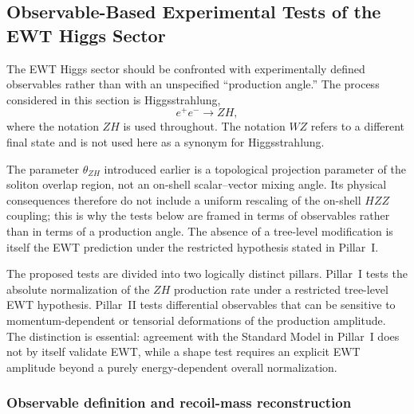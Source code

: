 \documentclass[10pt,a4paper]{article}
\begin{document}
\begin{center}
\end{center}

\subsection{Observable-Based Experimental Tests of the EWT Higgs Sector}
\label{sec:ewt_higgs_observable_tests}

The EWT Higgs sector should be confronted with experimentally defined observables rather than with an unspecified ``production angle.'' The process considered in this section is Higgsstrahlung,
\begin{equation}
	e^+e^- \to ZH,
\end{equation}
where the notation $ZH$ is used throughout. The notation $WZ$ refers to a different final state and is not used here as a synonym for Higgsstrahlung.

The parameter $\theta_{ZH}$ introduced earlier is a topological
projection parameter of the soliton overlap region, not an on-shell
scalar--vector mixing angle. Its physical consequences therefore do
not include a uniform rescaling of the on-shell $HZZ$ coupling; this
is why the tests below are framed in terms of observables rather than
in terms of a production angle. The absence of a tree-level
modification is itself the EWT prediction under the restricted
hypothesis stated in Pillar~I.

The proposed tests are divided into two logically distinct pillars. Pillar~I tests the absolute normalization of the $ZH$ production rate under a restricted tree-level EWT hypothesis. Pillar~II tests differential observables that can be sensitive to momentum-dependent or tensorial deformations of the production amplitude. The distinction is essential: agreement with the Standard Model in Pillar~I does not by itself validate EWT, while a shape test requires an explicit EWT amplitude beyond a purely energy-dependent overall normalization.

\subsubsection{Observable definition and recoil-mass reconstruction}
\label{sec:ewt_recoil_observable}
\end{document}
